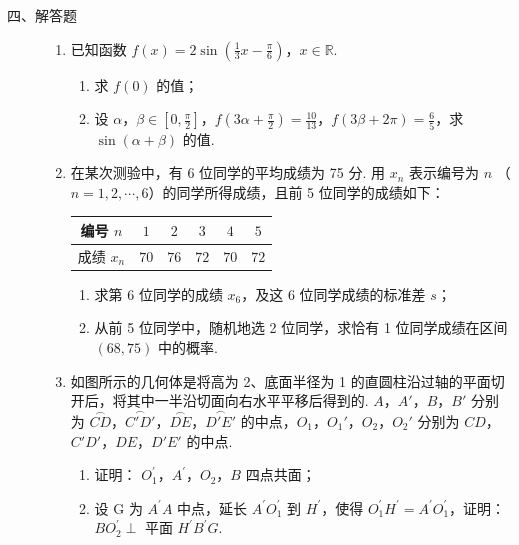 \begin{description}

    \item[四、解答题]

    \begin{enumerate}[leftmargin=5pt]

      \addtocounter{enumi}{+15}

        \item 已知函数 \(f(x) = 2\sin \left(\frac{1}{3} x - \frac{\pi}{6}\right)\)，\(x \in \mathbb{R}\).
\begin{enumerate}
\item 求 \( f(0) \) 的值；
\item 设 \(\alpha\)，\(\beta \in \left[0, \frac{\pi}{2}\right]\)，\(f\left(3\alpha + \frac{\pi}{2}\right) = \frac{10}{13}\)，\(f(3\beta + 2\pi) = \frac{6}{5}\)，求 \(\sin (\alpha + \beta)\) 的值.
\end{enumerate}

        \item 在某次测验中，有 6 位同学的平均成绩为 75 分. 用 \( x_{n} \) 表示编号为 \(n\) （\(n = 1, 2, \cdots, 6\)）的同学所得成绩，且前 5 位同学的成绩如下：

\begin{center}
\begin{tabular}{c|ccccc}
编号 \(n\) & \(1\) & \(2\) & \(3\) & \(4\) & \(5\) \\
\hline
成绩 \(x_{n}\) & \(70\) & \(76\) & \(72\) & \(70\) & \(72\)
\end{tabular}
\end{center}

\begin{enumerate}
\item 求第 6 位同学的成绩 \(x_6\)，及这 6 位同学成绩的标准差 \(s\)；
\item 从前 5 位同学中，随机地选 2 位同学，求恰有 1 位同学成绩在区间 \((68, 75)\) 中的概率.
\end{enumerate}

        \item 如图所示的几何体是将高为 2、底面半径为 1 的直圆柱沿过轴的平面切开后，将其中一半沿切面向右水平平移后得到的. \(A\)，\(A'\)，\(B\)，\(B'\) 分别为 \(\overset{\frown}{CD}\)，\(\overset{\frown}{C'D'}\)，\(\overset{\frown}{DE}\)，\(\overset{\frown}{D'E'}\) 的中点，\(O_1\)，\(O_1'\)，\(O_2\)，\(O_2'\) 分别为 \(CD\)，\(C'D'\)，\(DE\)，\(D'E'\) 的中点.

\begin{enumerate}
\item 证明： \(O_{1}^{\prime}\)，\(A^{\prime}\)，\(O_{2}\)，\(B\) 四点共面；
\item 设 G 为 \( A^{\prime}A \) 中点，延长 \( A^{\prime}O_{1}^{\prime} \) 到 \( H^{\prime} \)，使得 \( O_{1}^{\prime}H^{\prime}=A^{\prime}O_{1}^{\prime} \)，证明： \( BO_{2}^{\prime}\perp \) 平面 \( H^{\prime}B^{\prime}G \).
\end{enumerate}


\end{enumerate}
\end{description}
